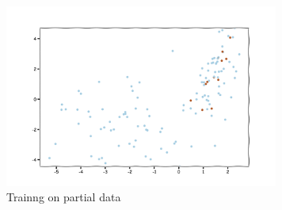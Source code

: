 \begin{answer}
  \begin{figure}[htpb]
    \centering
    \includegraphics[width=0.8\linewidth, height=6cm]{posonly/naive_training_partial.png}
    \caption{Trainng on partial data}%
    \label{}
  \end{figure}
\end{answer}
